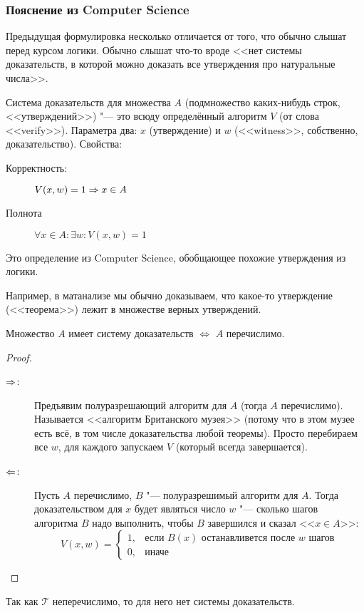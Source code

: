 \subsubsection{Пояснение из Computer Science}
Предыдущая формулировка несколько отличается от того, что обычно слышат перед курсом логики.
Обычно слышат что-то вроде <<нет системы доказательств, в которой можно доказать все утверждения
про натуральные числа>>.
\begin{Def}
	Система доказательств для множества $A$ (подмножество каких-нибудь строк, <<утверждений>>) "--- это всюду определённый алгоритм $V$ (от слова <<verify>>).
	Параметра два: $x$ (утверждение) и $w$ (<<witness>>, собственно, доказательство).
	Свойства:
	\begin{description}
	\item[Корректность:]
		$V(x, w) = 1 \Rightarrow x \in A$
	\item[Полнота]
		$\forall x \in A \colon \exists w \colon V(x, w) = 1$
	\end{description}
\end{Def}
\begin{Rem}
	Это определение из Computer Science, обобщающее похожие утверждения из логики.
\end{Rem}
\begin{Rem}
	Например, в матанализе мы обычно доказываем, что какое-то утверждение (<<теорема>>) лежит в множестве
	верных утверждений.
\end{Rem}

\begin{theorem}
	Множество $A$ имеет систему доказательств $\iff$ $A$ перечислимо.
\end{theorem}
\begin{proof}
	\begin{description}
	\item[$\Rightarrow$:]
		Предъявим полуразрешающий алгоритм для $A$ (тогда $A$ перечислимо).
		Называется <<алгоритм Британского музея>> (потому что в этом музее есть всё, в том числе доказательства любой теоремы).
		Просто перебираем все $w$, для каждого запускаем $V$ (который всегда завершается).
	\item[$\Leftarrow$:]
		Пусть $A$ перечислимо, $B$ "--- полуразрешимый алгоритм для $A$.
		Тогда доказательством для $x$ будет являться число $w$ "--- сколько шагов алгоритма $B$ надо выполнить,
		чтобы $B$ завершился и сказал <<$x \in A$>>:
		\[
		V(x, w) =
		\begin{cases}
		1,& \text{если $B(x)$ останавливется после $w$ шагов} \\
		0,& \text{иначе}
		\end{cases}
		\]
	\end{description}
\end{proof}
\begin{conseq}
	Так как $\mathcal{T}$ неперечислимо, то для него нет системы доказательств.
\end{conseq}

